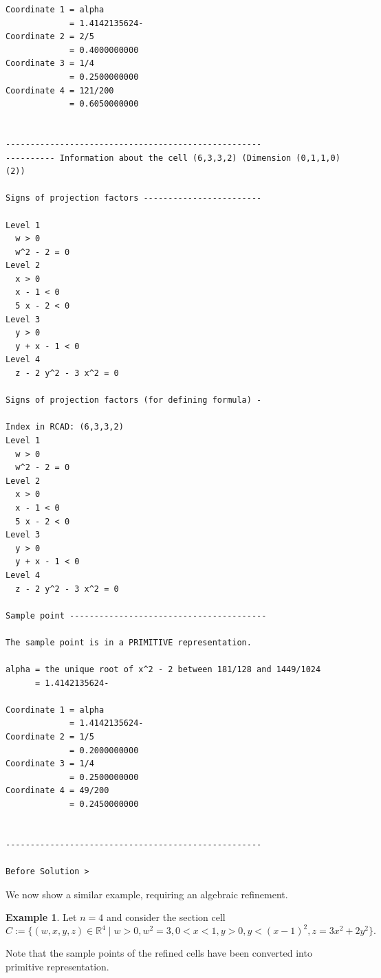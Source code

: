 \documentclass[
]{book}
\theoremstyle{definition}
\theoremstyle{definition}
\newtheorem{example}{Example}[chapter]
\theoremstyle{definition}
\theoremstyle{definition}
\theoremstyle{remark}
\begin{document}
\begin{verbatim}
Coordinate 1 = alpha
             = 1.4142135624-
Coordinate 2 = 2/5
             = 0.4000000000
Coordinate 3 = 1/4
             = 0.2500000000
Coordinate 4 = 121/200
             = 0.6050000000


----------------------------------------------------
---------- Information about the cell (6,3,3,2) (Dimension (0,1,1,0) (2))

Signs of projection factors ------------------------

Level 1
  w > 0
  w^2 - 2 = 0
Level 2
  x > 0
  x - 1 < 0
  5 x - 2 < 0
Level 3
  y > 0
  y + x - 1 < 0
Level 4
  z - 2 y^2 - 3 x^2 = 0

Signs of projection factors (for defining formula) -

Index in RCAD: (6,3,3,2)
Level 1
  w > 0
  w^2 - 2 = 0
Level 2
  x > 0
  x - 1 < 0
  5 x - 2 < 0
Level 3
  y > 0
  y + x - 1 < 0
Level 4
  z - 2 y^2 - 3 x^2 = 0

Sample point ----------------------------------------

The sample point is in a PRIMITIVE representation.

alpha = the unique root of x^2 - 2 between 181/128 and 1449/1024
      = 1.4142135624-

Coordinate 1 = alpha
             = 1.4142135624-
Coordinate 2 = 1/5
             = 0.2000000000
Coordinate 3 = 1/4
             = 0.2500000000
Coordinate 4 = 49/200
             = 0.2450000000


----------------------------------------------------

Before Solution >
\end{verbatim}

We now show a similar example, requiring an algebraic refinement.

\begin{example}
\protect\hypertarget{exm:qanm-4-alg}{}\label{exm:qanm-4-alg}Let \(n = 4\) and consider the section cell
\[
C := \{ (w,x,y,z) \in \mathbb{R}^4 \mid w > 0, w^2 = 3, 0 < x < 1, y > 0, y < (x-1)^2, z = 3x^2 + 2y^2 \}.
\]
\end{example}

Note that the sample points of the refined cells have been converted into primitive representation.
\end{document}
